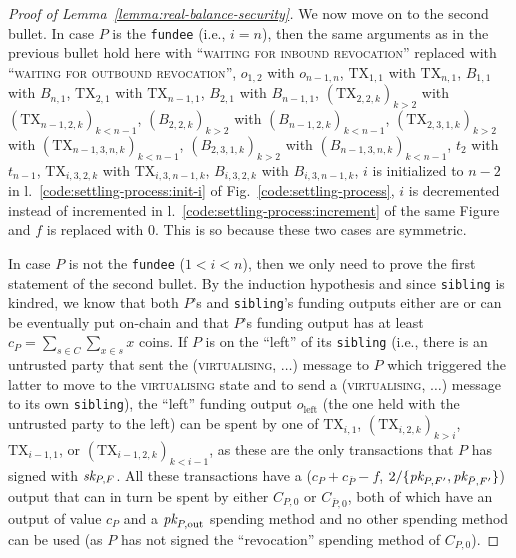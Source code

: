 \begin{proof}[Proof of Lemma~\ref{lemma:real-balance-security}]
  We now move on to the second bullet. In case $P$ is the \texttt{fundee} (i.e.,
  $i=n$), then the same arguments as in the previous bullet hold here with
  ``\textsc{waiting for inbound revocation}'' replaced with ``\textsc{waiting
  for outbound revocation}'', $o_{1, 2}$ with $o_{n-1, n}$, $\mathrm{TX}_{1, 1}$
  with $\mathrm{TX}_{n, 1}$, $B_{1, 1}$ with $B_{n, 1}$, $\mathrm{TX}_{2, 1}$
  with $\mathrm{TX}_{n-1, 1}$, $B_{2, 1}$ with $B_{n-1, 1}$, $(\mathrm{TX}_{2,
  2, k})_{k > 2}$ with $(\mathrm{TX}_{n-1, 2, k})_{k < n-1}$, $(B_{2, 2, k})_{k
  > 2}$ with $(B_{n-1, 2, k})_{k < n-1}$, $(\mathrm{TX}_{2, 3, 1, k})_{k > 2}$
  with $(\mathrm{TX}_{n-1, 3, n, k})_{k < n-1}$, $(B_{2, 3, 1, k})_{k > 2}$ with
  $(B_{n-1, 3, n, k})_{k < n-1}$, $t_2$ with $t_{n-1}$, $\mathrm{TX}_{i, 3, 2,
  k}$ with $\mathrm{TX}_{i, 3, n-1, k}$, $B_{i, 3, 2, k}$ with $B_{i, 3, n-1,
  k}$, $i$ is initialized to $n-2$ in l.~\ref{code:settling-process:init-i} of
  Fig.~\ref{code:settling-process}, $i$ is decremented instead of incremented in
  l.~\ref{code:settling-process:increment} of the same Figure and $f$ is
  replaced with $0$. This is so because these two cases are symmetric.

  In case $P$ is not the \texttt{fundee} ($1<i<n$), then we only need to prove
  the first statement of the second bullet. By the induction hypothesis and
  since \texttt{sibling} is kindred, we know that both $P$'s and
  \texttt{sibling}'s funding outputs either are or can be eventually put
  on-chain and that $P$'s funding output has at least $c_P = \sum\limits_{s \in
  C} \sum\limits_{x \in s} x$ coins. If $P$ is on the ``left'' of its
  \texttt{sibling} (i.e., there is an untrusted party that sent the
  (\textsc{virtualising}, $\dots$) message to $P$ which triggered the latter to
  move to the \textsc{virtualising} state and to send a (\textsc{virtualising},
  $\dots$) message to its own \texttt{sibling}), the ``left'' funding output
  $o_{\mathrm{left}}$ (the one held with the untrusted party to the left) can be
  spent by one of $\mathrm{TX}_{i, 1}$, $(\mathrm{TX}_{i, 2, k})_{k > i}$,
  $\mathrm{TX}_{i-1, 1}$, or $(\mathrm{TX}_{i-1, 2, k})_{k < i-1}$, as these are
  the only transactions that $P$ has signed with $\textit{sk}_{P, F}$. All these
  transactions have a ($c_P + c_{\bar{P}} - f$, $2/\{\textit{pk}_{P, F'}, \textit{pk}_{\bar{P},
  F'}\}$) output that can in turn be spent by either $C_{P, 0}$ or $C_{\bar{P},
  0}$, both of which have an output of value $c_P$ and a $\textit{pk}_{P, \mathrm{out}}$
  spending method and no other spending method can be used (as $P$ has not
  signed the ``revocation'' spending method of $C_{P, 0}$).


\end{proof}
